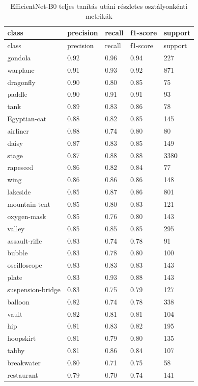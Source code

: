\begin{center}
\begin{longtable}{lllll}
\caption{EfficientNet-B0 teljes tanítás utáni részletes osztályonkénti metrikák}\label{tab:phase2_EfficientNet-B0_class_table}\\
\toprule
class & precision & recall & f1-score & support \\
\midrule
\endfirsthead
\toprule
class & precision & recall & f1-score & support \\
\midrule
\endhead
gondola & 0.92 & 0.96 & 0.94 & 227 \\
warplane & 0.91 & 0.93 & 0.92 & 871 \\
dragonfly & 0.90 & 0.80 & 0.85 & 75 \\
paddle & 0.90 & 0.91 & 0.91 & 93 \\
tank & 0.89 & 0.83 & 0.86 & 78 \\
Egyptian-cat & 0.88 & 0.82 & 0.85 & 145 \\
airliner & 0.88 & 0.74 & 0.80 & 80 \\
daisy & 0.87 & 0.83 & 0.85 & 149 \\
stage & 0.87 & 0.88 & 0.88 & 3380 \\
rapeseed & 0.86 & 0.82 & 0.84 & 77 \\
wing & 0.86 & 0.86 & 0.86 & 148 \\
lakeside & 0.85 & 0.87 & 0.86 & 801 \\
mountain-tent & 0.85 & 0.80 & 0.83 & 121 \\
oxygen-mask & 0.85 & 0.76 & 0.80 & 143 \\
valley & 0.85 & 0.85 & 0.85 & 295 \\
assault-rifle & 0.83 & 0.74 & 0.78 & 91 \\
bubble & 0.83 & 0.78 & 0.80 & 100 \\
oscilloscope & 0.83 & 0.83 & 0.83 & 143 \\
plate & 0.83 & 0.93 & 0.88 & 143 \\
suspension-bridge & 0.83 & 0.75 & 0.79 & 127 \\
balloon & 0.82 & 0.74 & 0.78 & 338 \\
vault & 0.82 & 0.81 & 0.81 & 104 \\
hip & 0.81 & 0.83 & 0.82 & 195 \\
hoopskirt & 0.81 & 0.79 & 0.80 & 135 \\
tabby & 0.81 & 0.86 & 0.84 & 107 \\
breakwater & 0.80 & 0.71 & 0.75 & 58 \\
restaurant & 0.79 & 0.70 & 0.74 & 141 \\

\end{longtable}
\end{center}
